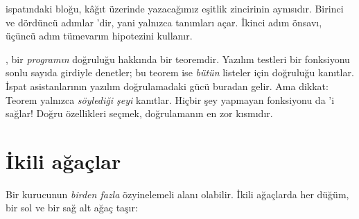 
\noindent {} ispatındaki  bloğu, kâğıt üzerinde
yazacağımız eşitlik zincirinin aynısıdır. Birinci ve dördüncü adımlar
'dir, yani yalnızca tanımları açar. İkinci adım önsavı, üçüncü
adım tümevarım hipotezini kullanır.

\begin{dikkat}
, bir \emph{programın} doğruluğu hakkında bir teoremdir.
Yazılım testleri bir fonksiyonu sonlu sayıda girdiyle denetler; bu
teorem ise \emph{bütün} listeler için doğruluğu kanıtlar. İspat
asistanlarının yazılım doğrulamadaki gücü buradan gelir. Ama dikkat:
Teorem yalnızca \emph{söylediği şeyi} kanıtlar. Hiçbir şey yapmayan
 fonksiyonu da 'i sağlar! Doğru
özellikleri seçmek, doğrulamanın en zor kısmıdır.
\end{dikkat}

\section{İkili ağaçlar}\label{sec:agaclar}

Bir kurucunun \emph{birden fazla} özyinelemeli alanı olabilir. İkili
ağaçlarda her düğüm, bir sol ve bir sağ alt ağaç taşır:



